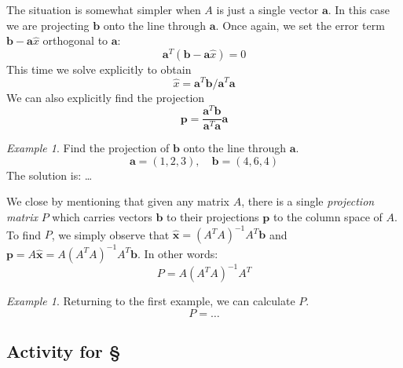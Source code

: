 \documentclass[11pt,oneside]{amsbook}
\theoremstyle{definition}
\theoremstyle{plain}
\theoremstyle{definition}
\theoremstyle{remark}
\newtheorem{example}[theorem]{Example}
\numberwithin{equation}{section}
\numberwithin{figure}{section}
\begin{document}
The situation is somewhat simpler when $A$ is just a single vector $\mathbf{a}$. In this case we are projecting $\mathbf{b}$ onto the line through $\mathbf{a}$. Once again, we set the error term $\mathbf{b}-\mathbf{a}\hat x$ orthogonal to $\mathbf{a}$:
\[\mathbf{a}^T(\mathbf{b}-\mathbf{a}\hat x)=0
\]
This time we solve explicitly to obtain
\[\hat x=\mathbf{a}^T\mathbf{b}/\mathbf{a}^T\mathbf{a}
\]
We can also explicitly find the projection
\[\mathbf{p}=
  \frac{\mathbf{a}^T\mathbf{b}}{\mathbf{a}^T\mathbf{a}}\mathbf{a}
\]

\begin{example}
  Find the projection of $\mathbf{b}$ onto the line through $\mathbf{a}$.
  \[\mathbf{a}=(1,2,3),\quad \mathbf{b}=(4,6,4)
  \]
  The solution is: \ldots
\end{example}

We close by mentioning that given any matrix $A$, there is a single \emph{projection matrix} $P$ which carries vectors $\mathbf{b}$ to their projections $\mathbf{p}$ to the column space of $A$. To find $P$, we simply observe that $\hat{\mathbf{x}}=(A^TA)^{-1}A^T\mathbf{b}$ and $\mathbf{p}=A\hat{\mathbf{x}}=A(A^TA)^{-1}A^T\mathbf{b}$. In other words:
\[P=A(A^TA)^{-1}A^T
\]

\begin{example}
  Returning to the first example, we can calculate $P$.
  \[P=\ldots
  \]
\end{example}

\newpage
\subsection*{Activity for \S \thesection}
\end{document}

